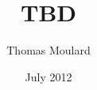 \documentclass[a4paper,twoside,openright]{book}
\begin{document}
\author{Thomas Moulard}
\title{TBD}
\date{July 2012}
\maketitle

\frontmatter
\tableofcontents{\thispagestyle{fancy}}

\mainmatter 


\backmatter
\printindex
\end{document}

